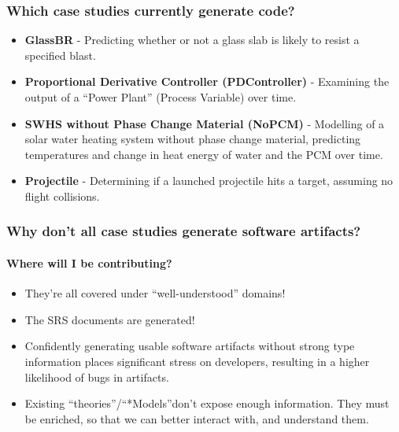 \documentclass{beamer}
\begin{document}
\begin{frame}
    \frametitle{Which case studies currently generate code?}

    \begin{itemize}
        \item<1-> \textbf{GlassBR} - Predicting whether or not a glass slab is likely to resist a specified blast.
        \item<2-> \textbf{Proportional Derivative Controller (PDController)} - Examining the output of a ``Power Plant'' (Process Variable) over time.
        \item<3-> \textbf{SWHS without Phase Change Material (NoPCM)} - Modelling of a solar water heating system without phase change material, predicting temperatures and change in heat energy of water and the PCM over time.
        \item<4-> \textbf{Projectile} - Determining if a launched projectile hits a target, assuming no flight collisions.
    \end{itemize}
\end{frame}

\begin{frame}
    \frametitle{Why don't all case studies generate software artifacts?}
    \framesubtitle{Where will I be contributing?}

    \begin{itemize}
        \item<3-> They're all covered under ``well-understood'' domains!
        \item<4-> The SRS documents are generated!\\
    \end{itemize}


    \begin{itemize}
        \item<7-> Confidently generating usable software artifacts without strong type information places significant stress on developers, resulting in a higher likelihood of bugs in artifacts.
        \item<8-> Existing ``theories''/``*Models''\footnotemark[1] don't expose enough information. They must be enriched, so that we can better interact with, and understand them.
    \end{itemize}

\end{frame}
\end{document}
